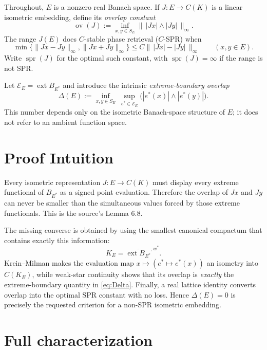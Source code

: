\documentclass[11pt]{article}
\newcommand{\ext}{\operatorname{ext}}
\newcommand{\spr}{\operatorname{spr}}
\newcommand{\ov}{\operatorname{ov}}
\begin{document}
Throughout, $E$ is a nonzero real Banach space.  If
$J:E\to C(K)$ is a linear isometric embedding, define its \emph{overlap
constant}
\[
 \ov(J):=\inf_{x,y\in S_E}
 \bigl\|\,|Jx|\wedge|Jy|\,\bigr\|_\infty.
\]
The range $J(E)$ does $C$-stable phase retrieval ($C$-SPR) when
\[
 \min\{\|Jx-Jy\|_\infty,\|Jx+Jy\|_\infty\}
 \leq C\bigl\|\,|Jx|-|Jy|\,\bigr\|_\infty
 \qquad(x,y\in E).
\]
Write $\spr(J)$ for the optimal such constant, with $\spr(J)=\infty$ if
the range is not SPR.

Let $\mathcal E_E=\ext B_{E^*}$ and introduce the intrinsic
\emph{extreme-boundary overlap}
\begin{equation}\label{eq:Delta}
 \Delta(E):=
 \inf_{x,y\in S_E}\ \sup_{e^*\in\mathcal E_E}
 \bigl(|e^*(x)|\wedge|e^*(y)|\bigr).
\end{equation}
This number depends only on the isometric Banach-space structure of $E$; it
does not refer to an ambient function space.

\section{Proof Intuition}

Every isometric representation $J:E\to C(K)$ must display every extreme
functional of $B_{E^*}$ as a signed point evaluation.  Therefore the overlap
of $Jx$ and $Jy$ can never be smaller than the simultaneous values forced by
those extreme functionals.  This is the source's Lemma 6.8.

The missing converse is obtained by using the smallest canonical compactum
that contains exactly this information:
\[
 K_E=\overline{\ext B_{E^*}}^{,w^*}.
\]
Krein--Milman makes the evaluation map $x\mapsto(e^*\mapsto e^*(x))$ an
isometry into $C(K_E)$, while weak-star continuity shows that its overlap is
\emph{exactly} the extreme-boundary quantity in \eqref{eq:Delta}.  Finally, a
real lattice identity converts overlap into the optimal SPR constant with no
loss.  Hence $\Delta(E)=0$ is precisely the requested criterion for a non-SPR
isometric embedding.

\section{Full characterization}
\end{document}
